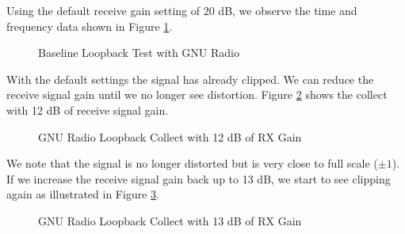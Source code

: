 \documentclass{article}
\begin{document}
Using the default receive gain setting of 20 dB, we observe the time and frequency data shown in Figure \ref{fig::gnu_radio_loopback_baseline}.

\begin{figure}[H]
	\centerline{}
	\caption{Baseline Loopback Test with GNU Radio}
	\label{fig::gnu_radio_loopback_baseline}
\end{figure}

With the default settings the signal has already clipped. We can reduce the receive signal gain until we no longer see distortion. Figure \ref{fig::gnu_radio_loopback_rx_gain_12dB} shows the collect with 12 dB of receive signal gain.

\begin{figure}[H]
	\centerline{}
	\caption{GNU Radio Loopback Collect with 12 dB of RX Gain}
	\label{fig::gnu_radio_loopback_rx_gain_12dB}
\end{figure}

We note that the signal is no longer distorted but is very close to full scale ($\pm 1$). If we increase the receive signal gain back up to 13 dB, we start to see clipping again as illustrated in Figure \ref{fig::gnu_radio_loopback_rx_gain_13dB}.

\begin{figure}[H]
	\centerline{}
	\caption{GNU Radio Loopback Collect with 13 dB of RX Gain}
	\label{fig::gnu_radio_loopback_rx_gain_13dB}
\end{figure}
\end{document}
